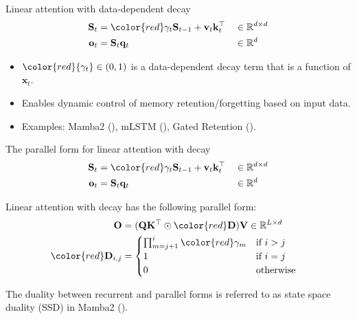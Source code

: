 \begin{frame}{Linear attention with data-dependent decay}
    \begin{align*}
        \mathbf{S}_t &= {\color{red}\gamma_t} \mathbf{S}_{t-1} + \mathbf{v}_t\mathbf{k}_t^\top &&\in \mathbb{R}^{d \times d}  \\
        \mathbf{o}_t &= \mathbf{S}_t\mathbf{q}_t &&\in \mathbb{R}^d  
    \end{align*}
    \begin{itemize}
        \item ${\color{red}{\gamma_t} \in (0, 1)}$ is a data-dependent decay term that is a function of $\mathbf{x}_t$.
        \item Enables dynamic control of memory retention/forgetting based on input data.
        \item Examples: Mamba2 (\cite{mamba2}), mLSTM (\cite{beck2024xlstm}), Gated Retention (\cite{sun2024you}).
    \end{itemize}
\end{frame}

\begin{frame}{The parallel form for linear attention with decay}
    \begin{align*}
        \mathbf{S}_t &= {\color{red}\gamma_t} \mathbf{S}_{t-1} + \mathbf{v}_t\mathbf{k}_t^\top &&\in \mathbb{R}^{d \times d}  \\
        \mathbf{o}_t &= \mathbf{S}_t\mathbf{q}_t &&\in \mathbb{R}^d  
    \end{align*}

    Linear attention with decay has the following parallel form:
    \begin{align*}
        \mathbf{O} &= (\mathbf{Q}\mathbf{K}^\top \odot {\color{red} \mathbf{D}})\mathbf{V} \in \mathbb{R}^{L\times d} && \\
        \color{red} \mathbf{D}_{i,j} &= \begin{cases}
            \prod_{m=j+1}^i {\color{red}\gamma_m} & \text{if } i > j \\
            1 & \text{if } i = j \\
            0 & \text{otherwise}
        \end{cases}
    \end{align*}

     The duality between recurrent and parallel forms is referred to as {\color{blue}state space duality (SSD)} in Mamba2 (\cite{mamba2}).
\end{frame}

